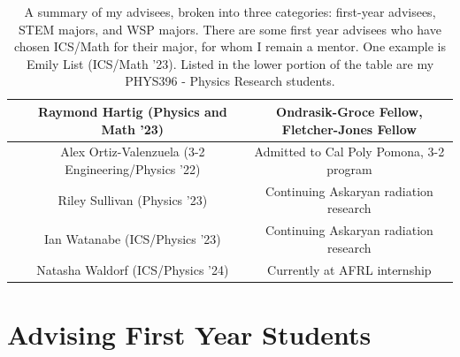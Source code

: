 \documentclass[../../main.tex]{subfiles}
\begin{document}
\begin{table}[hb]
\begin{tabular}{| c | c | c |}
& Raymond Hartig (Physics and Math '23) & Ondrasik-Groce Fellow, Fletcher-Jones Fellow \\ \hline
& Alex Ortiz-Valenzuela (3-2 Engineering/Physics '22) & Admitted to Cal Poly Pomona, 3-2 program \\ \hline
& Riley Sullivan (Physics '23) & Continuing Askaryan radiation research \\ \hline
& Ian Watanabe (ICS/Physics '23) & Continuing Askaryan radiation research \\ \hline
& Natasha Waldorf (ICS/Physics '24) & Currently at AFRL internship \\ \hline
\end{tabular}
\caption{\label{tab:advisees} A summary of my advisees, broken into three categories: first-year advisees, STEM majors, and WSP majors.  There are some first year advisees who have chosen ICS/Math for their major, for whom I remain a mentor.  One example is Emily List (ICS/Math '23).  Listed in the lower portion of the table are my PHYS396 - Physics Research students.}
\end{table}

\section{Advising First Year Students}
\end{document}
